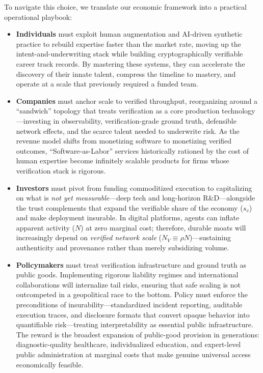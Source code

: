 \documentclass[12pt, letter]{article}
\begin{document}
To navigate this choice, we translate our economic framework into a practical operational playbook: 

\begin{itemize}
    \item \textbf{Individuals} must exploit human augmentation and AI-driven synthetic practice to rebuild expertise faster than the market rate, moving up the intent-and-underwriting stack while building cryptographically verifiable career track records. By mastering these systems, they can accelerate the discovery of their innate talent, compress the timeline to mastery, and operate at a scale that previously required a funded team.
    
    \item \textbf{Companies} must anchor scale to verified throughput, reorganizing around a ``sandwich'' topology that treats verification as a core production technology---investing in observability, verification-grade ground truth, defensible network effects, and the scarce talent needed to underwrite risk. As the revenue model shifts from monetizing software to monetizing verified outcomes, ``Software-as-Labor'' services historically rationed by the cost of human expertise become infinitely scalable products for firms whose verification stack is rigorous.
    
    \item \textbf{Investors} must pivot from funding commoditized execution to capitalizing on what is \emph{not yet measurable}---deep tech and long-horizon R\&D---alongside the trust complements that expand the verifiable share of the economy ($s_v$) and make deployment insurable. In digital platforms, agents can inflate apparent activity ($N$) at zero marginal cost; therefore, durable moats will increasingly depend on \emph{verified network scale} ($N_V \equiv \rho N$)---sustaining authenticity and provenance rather than merely subsidizing volume.
    
    \item \textbf{Policymakers} must treat verification infrastructure and ground truth as public goods. Implementing rigorous liability regimes and international collaborations will internalize tail risks, ensuring that safe scaling is not outcompeted in a geopolitical race to the bottom. Policy must enforce the preconditions of insurability---standardized incident reporting, auditable execution traces, and disclosure formats that convert opaque behavior into quantifiable risk---treating interpretability as essential public infrastructure. The reward is the broadest expansion of public-good provision in generations: diagnostic-quality healthcare, individualized education, and expert-level public administration at marginal costs that make genuine universal access economically feasible.
\end{itemize}
\end{document}
